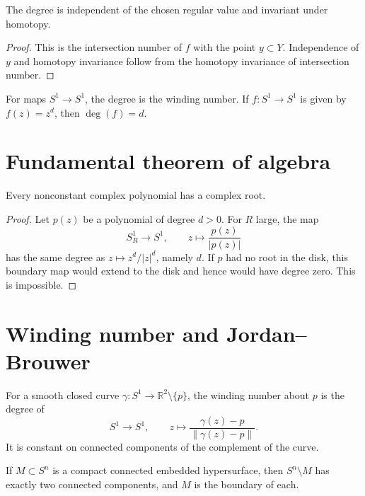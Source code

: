 \begin{proposition}
\label{proposition-degree-well-defined}
The degree is independent of the chosen
regular value and invariant under homotopy.
\end{proposition}

\begin{proof}
This is the intersection number of $f$ with
the point $y\subset Y$.  Independence of $y$
and homotopy invariance follow from the
homotopy invariance of intersection number.
\end{proof}

\begin{example}
\label{example-degree-circle}
For maps $S^1\to S^1$, the degree is the
winding number.  If $f:S^1\to S^1$ is given
by $f(z)=z^d$, then $\deg(f)=d$.
\end{example}

\section{Fundamental theorem of algebra}
\label{section-fundamental-theorem-algebra-degree}

\begin{proposition}
\label{proposition-fta-degree}
Every nonconstant complex polynomial has a
complex root.
\end{proposition}

\begin{proof}
Let $p(z)$ be a polynomial of degree $d>0$.
For $R$ large, the map
$$
S_R^1\to S^1,
\qquad
z\longmapsto \frac{p(z)}{|p(z)|}
$$
has the same degree as
$z\mapsto z^d/|z|^d$, namely $d$.  If $p$ had
no root in the disk, this boundary map would
extend to the disk and hence would have
degree zero.  This is impossible.
\end{proof}

\section{Winding number and Jordan--Brouwer}
\label{section-winding-jordan-brouwer}

\noindent
For a smooth closed curve
$\gamma:S^1\to \mathbb R^2\setminus\{p\}$,
the winding number about $p$ is the degree of
$$
S^1\to S^1,
\qquad
z\longmapsto
\frac{\gamma(z)-p}{\|\gamma(z)-p\|}.
$$
It is constant on connected components of the
complement of the curve.

\begin{theorem}
\label{theorem-jordan-brouwer}
If $M\subset S^n$ is a compact connected
embedded hypersurface, then
$S^n\setminus M$ has exactly two connected
components, and $M$ is the boundary of each.
\end{theorem}

